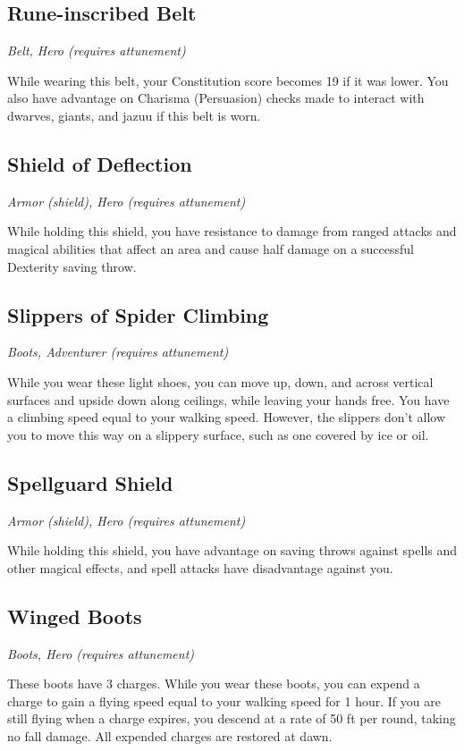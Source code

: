 \subsection{Rune-inscribed Belt}
\textit{Belt, Hero (requires attunement)}

While wearing this belt, your Constitution score becomes 19 if it was lower. You also have advantage on Charisma (Persuasion) checks made to interact with dwarves, giants, and jazuu if this belt is worn.

\subsection{Shield of Deflection}
\textit{Armor (shield), Hero (requires attunement)}

While holding this shield, you have resistance to damage from ranged attacks and magical abilities that affect an area and cause half damage on a successful Dexterity saving throw.

\subsection{Slippers of Spider Climbing}
\textit{Boots, Adventurer (requires attunement)}

While you wear these light shoes, you can move up, down, and across vertical surfaces and upside down along ceilings, while leaving your hands free. You have a climbing speed equal to your walking speed. However, the slippers don't allow you to move this way on a slippery surface, such as one covered by ice or oil.

\subsection{Spellguard Shield}
\textit{Armor (shield), Hero (requires attunement)}

While holding this shield, you have advantage on saving throws against spells and other magical effects, and spell attacks have disadvantage against you.

\subsection{Winged Boots}
\textit{Boots, Hero (requires attunement)}

These boots have 3 charges. While you wear these boots, you can expend a charge to gain a flying speed equal to your walking speed for 1 hour. If you are still flying when a charge expires, you descend at a rate of 50 ft per round, taking no fall damage. All expended charges are restored at dawn.

